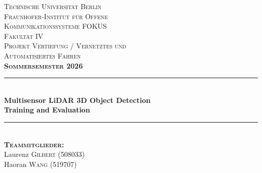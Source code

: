 \begin{titlepage}

\newcommand{\HRule}{\rule{\linewidth}{0.5mm}} %

\center %


\textsc{\LARGE Technische Universität Berlin}\\[1cm] %
\textsc{\Large Fraunhofer-Institut für Offene\\[0.1cm] Kommunikationssysteme FOKUS}\\[1cm] %
\textsc{\LARGE Fakultät IV}\\[1cm] %
\textsc{\Large Projekt Vertiefung / Vernetztes und \\[0.1cm]Automatisiertes Fahren}\\[0.3cm]
\textsc{\Large \textbf{Sommersemester 2026}}\\[1cm]


\HRule \\[0.4cm]
{ \huge \bfseries Multisensor LiDAR 3D Object Detection\\[0.2cm]
    \large Training and Evaluation}\\[0.4cm] %
\HRule \\[1cm]


\textsc{\large \textbf{Teammitglieder:} }\\ [0.2cm]%

\Large Laurenz \textsc{Gilbert} (508033) \\[0.1cm]

\Large Haoran \textsc{Wang} (519707) \\[0.7cm]


\end{titlepage}
